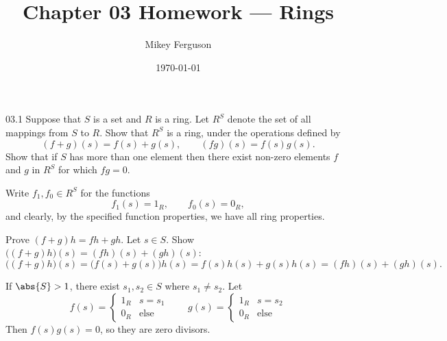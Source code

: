 \documentclass[11pt]{article}
\title{Chapter 03 Homework --- Rings}
\author{Mikey Ferguson}
\date{\today}
\begin{document}
\maketitle


\begin{problem}{03.1}
  Suppose that $S$ is a set and $R$ is a ring. Let $R^{S}$ denote the set of
  all mappings from $S$ to $R$. Show that $R^{S}$ is a ring, under the
  operations defined by
  \[
    (f+g)(s) = f(s) + g(s), \qquad (fg)(s) = f(s)g(s).
  \]
  Show that if $S$ has more than one element then there exist non-zero
  elements $f$ and $g$ in $R^{S}$ for which $fg = 0$.
\end{problem}
\begin{solution}
  Write $f_{1}, f_{0} \in R^{S}$ for the functions
  \[
    f_{1}(s) = 1_{R}, \qquad f_{0}(s) = 0_{R},
  \]
  and clearly, by the specified function properties, we have all ring
  properties.

  Prove $(f+g)h = fh + gh$. Let $s \in S$. Show
  $\bigl((f+g)h\bigr)(s) = (fh)(s) + (gh)(s)$:
  \[
    \bigl((f+g)h\bigr)(s)
      = \bigl(f(s) + g(s)\bigr)h(s)
      = f(s)h(s) + g(s)h(s)
      = (fh)(s) + (gh)(s).
  \]

  If $\abs{S} > 1$, there exist $s_{1}, s_{2} \in S$ where $s_{1} \neq s_{2}$.
  Let
  \[
    f(s) = \begin{cases} 1_{R} & s = s_{1} \\ 0_{R} & \text{else} \end{cases}
    \qquad
    g(s) = \begin{cases} 1_{R} & s = s_{2} \\ 0_{R} & \text{else} \end{cases}
  \]
  Then $f(s)g(s) = 0$, so they are zero divisors.
\end{solution}
\end{document}
